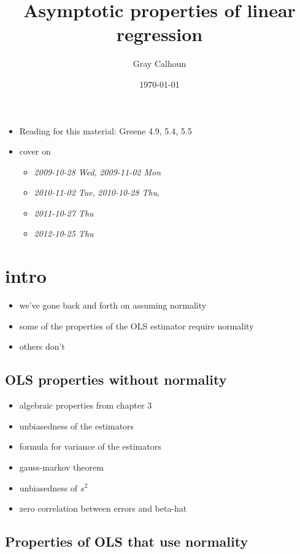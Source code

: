 \documentclass[11pt]{article}
\title{Asymptotic properties of linear regression}
\author{Gray Calhoun}
\date{\today}
\begin{document}
\maketitle

\setcounter{tocdepth}{2}
\tableofcontents
\vspace*{1cm}
\begin{itemize}
\item Reading for this material: Greene 4.9, 5.4, 5.5
\item cover on
\begin{itemize}
\item \textit{2009-10-28 Wed}, \textit{2009-11-02 Mon}
\item \textit{2010-11-02 Tue}, \textit{2010-10-28 Thu},
\item \textit{2011-10-27 Thu}
\item \textit{2012-10-25 Thu}
\end{itemize}
\end{itemize}
\section{intro}
\label{sec-1}

\begin{itemize}
\item we've gone back and forth on assuming normality
\item some of the properties of the OLS estimator require normality
\item others don't
\end{itemize}
\subsection{OLS properties without normality}
\label{sec-1-1}

\begin{itemize}
\item algebraic properties from chapter 3
\item unbiasedness of the estimators
\item formula for variance of the estimators
\item gauss-markov theorem
\item unbiasedness of $s^2$
\item zero correlation between errors and beta-hat
\end{itemize}
\subsection{Properties of OLS that use normality}
\label{sec-1-2}
\end{document}
